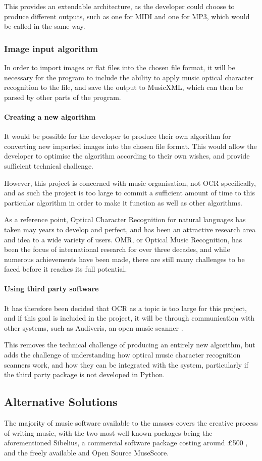 This provides an extendable architecture, as the developer could choose to produce different outputs, such as one for MIDI and one for MP3, which would be called in the same way.
\subsubsection{Image input algorithm}
In order to import images or flat files into the chosen file format, it will be necessary for the program to include the ability to apply music optical character recognition to the file, and save the output to MusicXML, which can then be parsed by other parts of the program. 

\paragraph{Creating a new algorithm}
It would be possible for the developer to produce their own algorithm for converting new imported images into the chosen file format. This would allow the developer to optimise the algorithm according to their own wishes, and provide sufficient technical challenge.

However, this project is concerned with music organisation, not OCR specifically, and as such the project is too large to commit a sufficient amount of time to this particular algorithm in order to make it function as well as other algorithms. 

As a reference point, Optical Character Recognition for natural languages has taken may years to develop and perfect, and has been an attractive research area and idea to a wide variety of users\parencite{InternationalConf}. OMR, or Optical Music Recognition, has been the focus of international research for over three decades, and while numerous achievements have been made, there are still many challenges to be faced before it reaches its full potential\parencite{musicocr}. 

\paragraph{Using third party software}
It has therefore been decided that OCR as a topic is too large for this project, and if this goal is included in the project, it will be through communication with other systems, such as Audiveris, an open music scanner \parencite{audiveris}. 

This removes the technical challenge of producing an entirely new algorithm, but adds the challenge of understanding how optical music character recognition scanners work, and how they can be integrated with the system, particularly if the third party package is not developed in Python.
\subsection{Alternative Solutions}
The majority of music software available to the masses covers the creative process of writing music, with the two most well known packages being the aforementioned Sibelius, a commercial software package costing around £500 \parencite{avid}, and the freely available and Open Source MuseScore\parencite{MuseTour}.